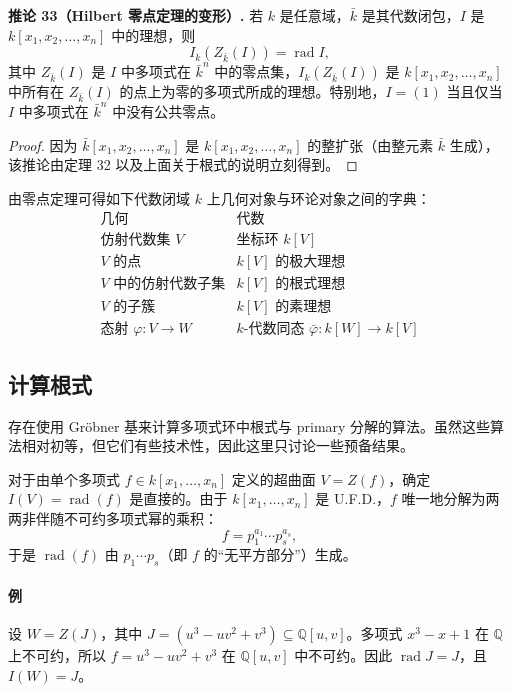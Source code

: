\noindent\textbf{推论 33（Hilbert 零点定理的变形）.} 若 $k$ 是任意域，$\bar k$ 是其代数闭包，$I$ 是 $k[x_1,x_2,
\ldots,x_n]$ 中的理想，则
\[
I_k(Z_{\bar k}(I))=\operatorname{rad}I,
\]
其中 $Z_{\bar k}(I)$ 是 $I$ 中多项式在 $\bar k^n$ 中的零点集，$I_k(Z_{\bar k}(I))$ 是 $k[x_1,x_2,
\ldots,x_n]$ 中所有在 $Z_{\bar k}(I)$ 的点上为零的多项式所成的理想。特别地，$I=(1)$ 当且仅当 $I$ 中多项式在 $\bar k^n$ 中没有公共零点。

\begin{proof}
	因为 $\bar k[x_1,x_2,
	\ldots,x_n]$ 是 $k[x_1,x_2,
	\ldots,x_n]$ 的整扩张（由整元素 $\bar k$ 生成），该推论由定理 32 以及上面关于根式的说明立刻得到。
\end{proof}

由零点定理可得如下代数闭域 $k$ 上几何对象与环论对象之间的字典：
\[
\begin{array}{c|c}
	\text{几何} & \text{代数}\\ \hline
	\text{仿射代数集 }V & \text{坐标环 }k[V]\\
	V\text{ 的点} & k[V]\text{ 的极大理想}\\
	V\text{ 中的仿射代数子集} & k[V]\text{ 的根式理想}\\
	V\text{ 的子簇} & k[V]\text{ 的素理想}\\
	\text{态射 }\varphi:V\to W & k\text{-代数同态 }\bar\varphi:k[W]\to k[V]
\end{array}
\]

\subsection*{计算根式}

存在使用 Gröbner 基来计算多项式环中根式与 primary 分解的算法。虽然这些算法相对初等，但它们有些技术性，因此这里只讨论一些预备结果。

对于由单个多项式 $f\in k[x_1,
\ldots,x_n]$ 定义的超曲面 $V=Z(f)$，确定 $I(V)=\operatorname{rad}(f)$ 是直接的。由于 $k[x_1,
\ldots,x_n]$ 是 U.F.D.，$f$ 唯一地分解为两两非伴随不可约多项式幂的乘积：
\[
f=p_1^{a_1}\cdots p_s^{a_s},
\]
于是 $\operatorname{rad}(f)$ 由 $p_1\cdots p_s$（即 $f$ 的“无平方部分”）生成。

\paragraph{例}
设 $W=Z(J)$，其中 $J=(u^3-uv^2+v^3)\subseteq\mathbb Q[u,v]$。多项式 $x^3-x+1$ 在 $\mathbb Q$ 上不可约，所以 $f=u^3-uv^2+v^3$ 在 $\mathbb Q[u,v]$ 中不可约。因此 $\operatorname{rad}J=J$，且 $I(W)=J$。

